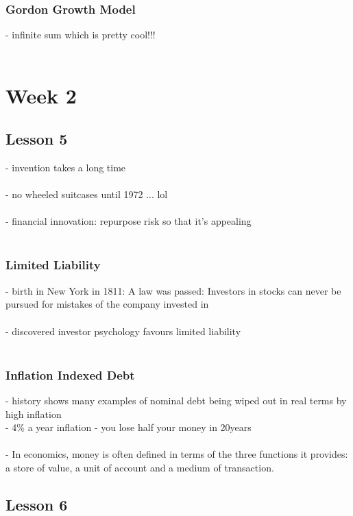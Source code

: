 \documentclass{article} %
\begin{document}
			\subsubsection*{Gordon Growth Model}
			- infinite sum which is pretty cool!!! \\
			\\
		
     \section*{Week 2}
     
     	\subsection*{Lesson 5}	
     	- invention takes a long time \\
     	\\
     	- no wheeled suitcases until 1972 ... lol \\
     	\\
     	- financial innovation: repurpose risk so that it's appealing\\
     	\\
     	\subsubsection*{Limited Liability}
     	- birth in New York in 1811: A law was passed: Investors in stocks can never be pursued for mistakes of the company invested in \\
     	\\
     	- discovered investor psychology favours limited liability \\
     	\\
     	\subsubsection*{Inflation Indexed Debt}
     	- history shows many examples of nominal debt being wiped out in real terms by high inflation \\
     	- 4\% a year inflation - you lose half your money in 20years \\
     	\\ 
     	- In economics, money is often defined in terms of the three functions it provides: a store of value, a unit of account and a medium of transaction.
     	\subsection*{Lesson 6}	
     	
\end{document}
